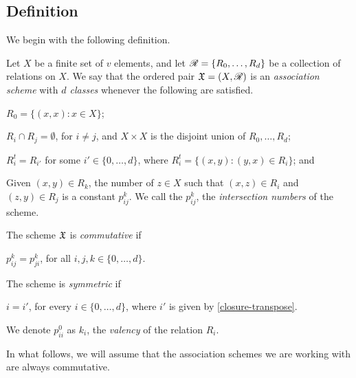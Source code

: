 \documentclass[../../../main]{subfiles}
\begin{document}

\subsection{Definition}

 We begin with the following definition.
 
 \begin{defin}\label{ass-scheme-def}
  Let $X$ be a finite set of $v$ elements, and let $\mathscr{R}=\{R_0, \dots, R_d\}$ be a collection of relations on $X$. We say that the ordered pair $\mathfrak{X}=(X,\mathscr{R})$ is an {\it association scheme} with {\it $d$ classes} whenever the following are satisfied.
  \begin{defenum}
   \item $R_0=\{(x,x) : x \in X\}$;
   \item $R_i \cap R_j = \emptyset$, for $i \neq j$, and $X \times X$ is the disjoint union of $R_0, \dots, R_d$;
   \item\label{closure-transpose} $R_i^t=R_{i'}$ for some $i' \in \{0, \dots, d\}$, where $R_i^t=\{(x,y) : (y,x) \in R_i\}$; and
   \item Given $(x,y) \in R_k$, the number of $z \in X$ such that $(x,z) \in R_i$ and $(z,y) \in R_j$ is a constant $p_{ij}^k$. We call the $p_{ij}^k$, the {\it intersection numbers} of the scheme.
  \end{defenum}
  The scheme $\mathfrak{X}$ is {\it commutative} if
  \begin{defenum}[resume]
   \item $p_{ij}^k=p_{ji}^k$, for all $i,j,k \in \{0, \dots, d\}$.
  \end{defenum}
  The scheme is {\it symmetric} if
  \begin{defenum}[resume]
  \item $i=i'$, for every $i \in \{0, \dots, d\}$, where $i'$ is given by
    \ref{closure-transpose}. 
  \end{defenum}
  We denote $p_{ii}^0$ as $k_i$, the {\it valency} of the relation $R_i$.
 \end{defin}
 
 In what follows, we will assume that the association schemes we are working
 with are always commutative. 
 
 \dinkus

\end{document}
